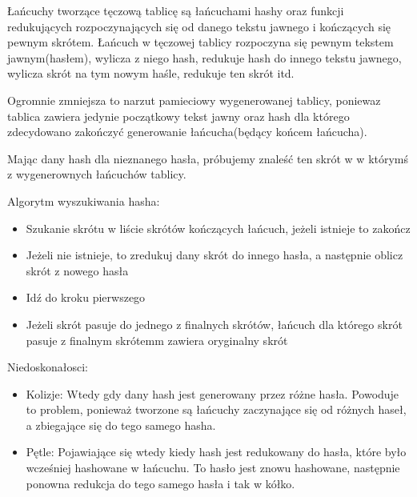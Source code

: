 \documentclass[a4paper,11pt]{article}
\begin{document}
Łańcuchy tworzące tęczową tablicę są łańcuchami hashy oraz funkcji redukujących rozpoczynających się od danego tekstu jawnego i kończących się pewnym skrótem. Łańcuch w tęczowej tablicy rozpoczyna się pewnym tekstem jawnym(hasłem), wylicza z niego hash, redukuje hash do innego tekstu jawnego, wylicza skrót na tym nowym haśle, redukuje ten skrót itd.

Ogromnie zmniejsza to narzut pamieciowy wygenerowanej tablicy, poniewaz tablica zawiera jedynie początkowy tekst jawny oraz hash dla którego zdecydowano zakończyć generowanie łańcucha(będący końcem łańcucha).

Mając dany hash dla nieznanego hasła, próbujemy znaleść ten skrót w w którymś z wygenerownych łańcuchów tablicy.

Algorytm wyszukiwania hasha:
\begin{itemize}
  \item Szukanie skrótu w liście skrótów kończących łańcuch, jeżeli istnieje to zakończ
  \item Jeżeli nie istnieje, to zredukuj dany skrót do innego hasła, a następnie oblicz skrót z nowego hasła
  \item Idź do kroku pierwszego
  \item Jeżeli skrót pasuje do jednego z finalnych skrótów, łańcuch dla którego skrót pasuje z finalnym skrótemm zawiera oryginalny skrót
\end{itemize}

Niedoskonałosci:
\begin{itemize}
  \item Kolizje: Wtedy gdy dany hash jest generowany przez różne hasła. Powoduje to problem, ponieważ tworzone są łańcuchy zaczynające się od różnych haseł, a zbiegające się do tego samego hasha.
  \item Pętle: Pojawiające się wtedy kiedy hash jest redukowany do hasła, które było wcześniej hashowane w łańcuchu. To hasło jest znowu hashowane, następnie ponowna redukcja do tego samego hasła i tak w kółko.
\end{itemize}
\end{document}
